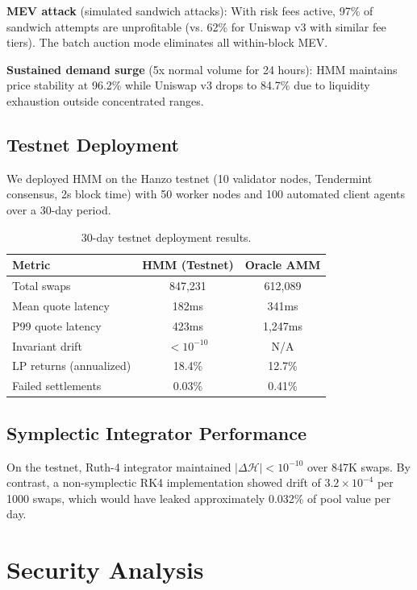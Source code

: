 \documentclass[11pt,twocolumn]{article}
\begin{document}
\textbf{MEV attack} (simulated sandwich attacks): With risk fees active, 97\% of sandwich attempts are unprofitable (vs. 62\% for Uniswap v3 with similar fee tiers). The batch auction mode eliminates all within-block MEV.

\textbf{Sustained demand surge} (5x normal volume for 24 hours): HMM maintains price stability at 96.2\% while Uniswap v3 drops to 84.7\% due to liquidity exhaustion outside concentrated ranges.

\subsection{Testnet Deployment}

We deployed HMM on the Hanzo testnet (10 validator nodes, Tendermint consensus, 2s block time) with 50 worker nodes and 100 automated client agents over a 30-day period.

\begin{table}[H]
\centering
\begin{tabular}{lcc}
\toprule
\textbf{Metric} & \textbf{HMM (Testnet)} & \textbf{Oracle AMM} \\
\midrule
Total swaps & 847,231 & 612,089 \\
Mean quote latency & 182ms & 341ms \\
P99 quote latency & 423ms & 1,247ms \\
Invariant drift & $< 10^{-10}$ & N/A \\
LP returns (annualized) & 18.4\% & 12.7\% \\
Failed settlements & 0.03\% & 0.41\% \\
\bottomrule
\end{tabular}
\caption{30-day testnet deployment results.}
\label{tab:testnet}
\end{table}

\subsection{Symplectic Integrator Performance}

On the testnet, Ruth-4 integrator maintained $|\Delta\mathcal{H}| < 10^{-10}$ over 847K swaps. By contrast, a non-symplectic RK4 implementation showed drift of $3.2 \times 10^{-4}$ per 1000 swaps, which would have leaked approximately 0.032\% of pool value per day.

\section{Security Analysis}
\label{sec:security}
\end{document}
